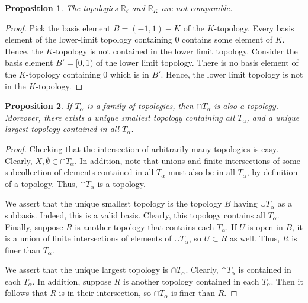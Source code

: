 \documentclass[10pt, oneside]{amsart}
\newtheorem{prop}{Proposition}
\begin{document}
    \begin{prop}
     The topologies $\mathbb{R}_{\ell}$ and $\mathbb{R}_{K}$ are not comparable.
    \end{prop}

    \begin{proof}
      Pick the basis element $B = (-1, 1) - K$ of the $K$-topology. Every basis element of the lower-limit topology containing $0$ contains some element of $K$. Hence, the $K$-topology is not contained in the lower limit topology. Consider the
      basis element $B' = [0, 1)$ of the lower limit topology. There is no basis element of the $K$-topology containing $0$ which is in $B'$. Hence, the lower limit topology is not in the $K$-topology.
    \end{proof}

    \begin{prop}
      If $T_{\alpha}$ is a family of topologies, then $\cap T_{\alpha}$ is also a topology. Moreover, there exists a unique smallest topology containing all $T_{\alpha}$, and a unique largest topology contained in all $T_{\alpha}$.
    \end{prop}

    \begin{proof}
      Checking that the intersection of arbitrarily many topologies is easy. Clearly, $X, \emptyset \in \cap T_{\alpha}$. In addition, note that unions and finite intersections
      of some subcollection of elements contained in all $T_{\alpha}$ must also be in all $T_{\alpha}$, by definition of a topology. Thus, $\cap T_\alpha$ is a topology.
      \newline

      We assert that the unique smallest topology is the topology $B$ having $\cup T_{\alpha}$ as a subbasis. Indeed, this is a valid basis. Clearly, this topology contains all $T_{\alpha}$. Finally,
      suppose $R$ is another topology that contains each $T_\alpha$. If $U$ is open in $B$, it is a union of finite intersections of elements of $\cup T_{\alpha}$, so $U \subset R$ as well. Thus, $R$ is finer than $T_\alpha$.
      \newline

      We assert that the unique largest topology is $\cap T_\alpha$. Clearly, $\cap T_\alpha$ is contained in each $T_\alpha$. In addition, suppose $R$ is another topology contained in each $T_\alpha$. Then it follows that
      $R$ is in their intersection, so $\cap T_\alpha$ is finer than $R$.
    \end{proof}
\end{document}

